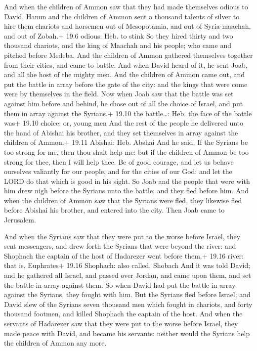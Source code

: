  And when the children of Ammon saw that they had made
themselves odious to David, Hanun and the children of Ammon sent a
thousand talents of silver to hire them chariots and horsemen out of
Mesopotamia, and out of Syria-maachah, and out of Zobah.+ 19.6 odious:
Heb. to stink  So they hired thirty and two thousand
chariots, and the king of Maachah and his people; who came and pitched
before Medeba. And the children of Ammon gathered themselves together
from their cities, and came to battle.  And when David heard
of it, he sent Joab, and all the host of the mighty men. 
And the children of Ammon came out, and put the battle in array before
the gate of the city: and the kings that were come were by themselves in
the field.  Now when Joab saw that the battle was set
against him before and behind, he chose out of all the choice of Israel,
and put them in array against the Syrians.+ 19.10 the battle\ldots: Heb.
the face of the battle was+ 19.10 choice: or, young men 
And the rest of the people he delivered unto the hand of Abishai his
brother, and they set themselves in array against the children of
Ammon.+ 19.11 Abishai: Heb. Abshai  And he said, If the
Syrians be too strong for me, then thou shalt help me: but if the
children of Ammon be too strong for thee, then I will help thee.
 Be of good courage, and let us behave ourselves valiantly
for our people, and for the cities of our God: and let the LORD do that
which is good in his sight.  So Joab and the people that
were with him drew nigh before the Syrians unto the battle; and they
fled before him.  And when the children of Ammon saw that
the Syrians were fled, they likewise fled before Abishai his brother,
and entered into the city. Then Joab came to Jerusalem.

 And when the Syrians saw that they were put to the worse
before Israel, they sent messengers, and drew forth the Syrians that
were beyond the river: and Shophach the captain of the host of Hadarezer
went before them.+ 19.16 river: that is, Euphrates+ 19.16 Shophach: also
called, Shobach  And it was told David; and he gathered all
Israel, and passed over Jordan, and came upon them, and set the battle
in array against them. So when David had put the battle in array against
the Syrians, they fought with him.  But the Syrians fled
before Israel; and David slew of the Syrians seven thousand men which
fought in chariots, and forty thousand footmen, and killed Shophach the
captain of the host.  And when the servants of Hadarezer
saw that they were put to the worse before Israel, they made peace with
David, and became his servants: neither would the Syrians help the
children of Ammon any more.

